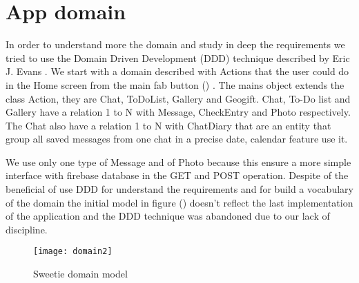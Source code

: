 
\section{App domain}
\label{sec:app-domain}

In order to understand more the domain and study in deep the requirements we tried to use the Domain Driven Development (DDD) technique described by Eric J. Evans \cite{DDD_Eric}. We start with a domain described with Actions that the user could do in the Home screen from the main fab button () .
The mains object extends the class Action, they are Chat, ToDoList, Gallery and Geogift. Chat, To-Do list and Gallery have a relation 1 to N with Message, CheckEntry and Photo respectively. The Chat also have a relation 1 to N with ChatDiary that are an entity that group all saved messages from one chat in a precise date, calendar feature use it. 

We use only one type of Message and of Photo because this ensure a more simple interface with firebase database in the GET and POST operation. Despite of the beneficial of use DDD for understand the requirements and for build a vocabulary of the domain the initial model in figure () doesn't reflect the last implementation of the application and the DDD technique was abandoned due to our lack of discipline.

\begin{figure}[hb]
	\texttt{[image: domain2]}
	\caption{Sweetie domain model}
	\label{fig:DDD_model}
\end{figure}